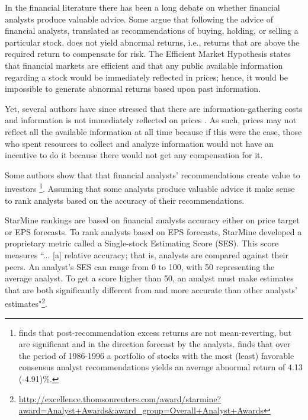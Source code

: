 \documentclass{book}
\begin{document}
In the financial literature there has been a long debate on whether financial analysts produce valuable  advice. Some argue that following the advice of financial analysts,  translated as recommendations of buying, holding, or selling a particular stock, does not yield  abnormal returns, i.e.,  returns that are above the required return to compensate for risk. The Efficient Market Hypothesis \citep{fama1970ecm} states that financial markets are efficient and that any public available information  regarding a stock would be immediately reflected in prices; hence, it would be  impossible to generate abnormal returns based upon past information.

Yet, several authors have since stressed that  there are information-gathering costs and information is not immediately reflected on prices  \citep{grossman1980iie}. As such, prices may not  reflect all the available information at all time because if this were the case, those who spent resources to collect and analyze   information would not have an incentive to do it because there would not get any compensation for it.



Some authors show that that financial analysts' recommendations create value to investors \citep{womack1996,barber2001}\footnote{\cite{womack1996} finds that  post-recommendation excess returns are not mean-reverting, but are significant and in the direction forecast by the analysts. \cite{barber2001} finds that over the period of 1986-1996 a portfolio of stocks with the most (least) favorable consensus analyst recommendations yields an average abnormal return of 4.13 (-4.91)\%.}. Assuming that some analysts produce valuable advice it make sense to rank analysts based on the accuracy of their recommendations. 

StarMine rankings are based on financial analysts accuracy either on price target or EPS forecasts. To rank analysts based on EPS forecasts, StarMine developed a proprietary metric called a Single-stock Estimating Score (SES). This score measures ``... [a] relative accuracy; that is, analysts are compared against their peers. An analyst's SES can range from 0 to 100, with 50 representing the average analyst. To get a score higher than 50, an analyst must make estimates that are both significantly different from and more accurate than other analysts' estimates"\footnote{\url{http://excellence.thomsonreuters.com/award/starmine?award=Analyst+Awards&award_group=Overall+Analyst+Awards}}.
\end{document}
